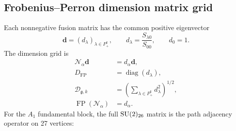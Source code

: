 \documentclass[11pt]{article}
\newcommand{\SU}{\mathrm{SU}}
\newcommand{\FP}{\operatorname{FP}}
\newcommand{\diag}{\operatorname{diag}}
\newcommand{\fusion}{\mathcal{N}}
\begin{document}
\subsection{Frobenius--Perron dimension matrix grid}
Each nonnegative fusion matrix has the common positive eigenvector
\begin{equation}
  \mathbf{d}=(d_\lambda)_{\lambda\in P_+^k},
  \qquad
  d_\lambda=\frac{S_{\lambda0}}{S_{00}},
  \qquad d_0=1.
  \label{eq:qdim-vector}
\end{equation}
The dimension grid is
\begin{equation}
\begin{aligned}
  \fusion_\alpha\mathbf{d} &= d_\alpha\mathbf{d},\\
  D_{\mathrm{FP}} &= \diag(d_\lambda),\\
  \mathcal{D}_{\mathfrak{g},k}
    &=\left(\sum_{\lambda\in P_+^k}d_\lambda^2\right)^{1/2},\\
  \FP(\fusion_\alpha)&=d_\alpha.
\end{aligned}
\label{eq:fp-grid}
\end{equation}
For the \(A_1\) fundamental block, the full \(\SU(2)_{\benchmarkLeptonLevel}\) matrix is the path adjacency operator on 27 vertices:
\begingroup
\scriptsize
\setcounter{MaxMatrixCols}{27}
\setlength{\arraycolsep}{1.05pt}
\renewcommand{\arraystretch}{0.82}
\end{document}
